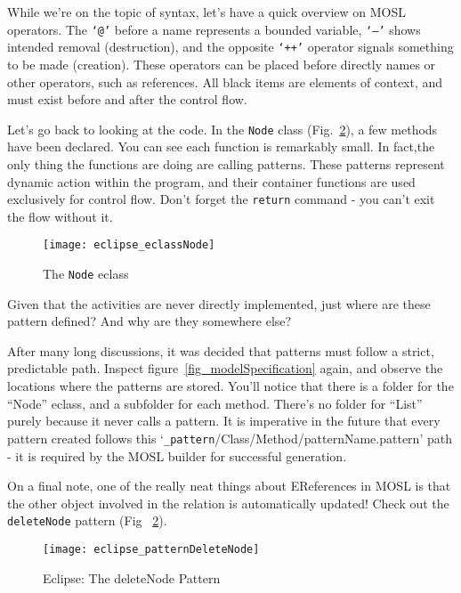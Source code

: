While we're on the topic of syntax, let's have a quick overview on MOSL operators. The \texttt{`@'} before a name represents a bounded variable, \texttt{`--'} shows intended removal (destruction), and the opposite \texttt{`++'} operator signals something to be made (creation). These operators can be placed before directly names or other operators, such as references.  All black items are elements of context, and must exist before and after the control flow. 

Let's go back to looking at the code. In the \texttt{Node} class (Fig.~\ref{fig_patternDeleteNode}), a few methods have been declared. You can see each function is remarkably small. In fact,the only thing the functions are doing are calling patterns. These patterns represent dynamic action within the program, and their container functions are used exclusively for control flow. Don't forget the \texttt{return} command - you can't exit the flow without it. 

 \begin{figure}[htbp]
  \centering
  \texttt{[image: eclipse\_eclassNode]}
  \caption{The \texttt{Node} eclass}
  \label{fig_eclassNode}
\end{figure}

Given that the activities are never directly implemented, just where are these pattern defined? And why are they somewhere else? 

After many long discussions, it was decided that patterns must follow a strict, predictable path. Inspect figure~\ref{fig_modelSpecification} again, and observe the locations where the patterns are stored. You'll notice that there is a folder for the ``Node'' eclass, and a subfolder for each method. There's no folder for ``List'' purely because it never calls a pattern. It is imperative in the future that every pattern created follows this `\texttt{\_pattern}/Class/Method/patternName.pattern' path - it is required by the MOSL builder for successful generation.

On a final note, one of the really neat things about EReferences in MOSL is that the other object involved in the relation is automatically updated! Check out the \texttt{deleteNode} pattern (Fig ~\ref{fig_patternDeleteNode}). 

 \begin{figure}[htbp]
  \centering
  \texttt{[image: eclipse\_patternDeleteNode]}
  \caption{Eclipse: The deleteNode Pattern}
  \label{fig_patternDeleteNode}
\end{figure}

